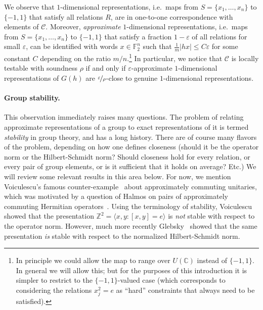 \documentclass[11pt]{article}
\theoremstyle{definition}
\newcommand{\code}{\mathscr{C}}
\newcommand{\C}{\ensuremath{\mathbb{C}}}
\newcommand{\F}{\ensuremath{\mathbb{F}}}
\newcommand{\Z}{\ensuremath{\mathbb{Z}}}
\newcommand{\eps}{\varepsilon}
\begin{document}
We observe that $1$-dimensional representations, i.e.\ maps from $S=\{x_1,\ldots,x_n\}$ to $\{-1,1\}$ that satisfy all relations $R$, are in one-to-one correspondence with elements of $\code$. Moreover, \emph{approximate} $1$-dimensional representations, i.e.\ maps from  $S=\{x_1,\ldots,x_n\}$ to $\{-1,1\}$ that satisfy a fraction $1-\eps$ of all relations for small $\eps$, can be identified with words $x\in\F_2^n$ such that $\frac{1}{m}|hx|\leq C\eps$ for some constant $C$ depending on the ratio $m/n$.\footnote{In principle we could allow the map to range over $U(\C)$ instead of $\{-1,1\}$. In general we will allow this; but for the purposes of this introduction it is simpler to restrict to the $\{-1,1\}$-valued case (which corresponds to considering the relations $x_j^2=e$ as ``hard'' constraints that always need to be satisfied).} In particular, we notice that $\code$ is locally testable with soundness $\rho$ if and only if $\eps$-approximate $1$-dimensional representations of $G(h)$ are $\nicefrac{\eps}{\rho}$-close to genuine $1$-dimensional representations. 

\paragraph{Group stability.}
This observation immediately raises many questions. The problem of relating approximate representations of a group to exact representations of it is termed \emph{stability} in group theory, and has a long history. There are of course many flavors of the problem, depending on how one defines closeness (should it be the operator norm or the Hilbert-Schmidt norm? Should closeness hold for every relation, or every pair of group elements, or is it sufficient that it holds on average? Etc.) We will review some relevant results in this area below. For now, we mention Voiculescu's famous counter-example~\cite{voiculescu1983asymptotically} about approximately commuting unitaries, which was motivated by a question of Halmos on pairs of approximately commuting Hermitian operators~\cite{halmos1976some}. Using the terminology of stability, Voiculescu showed that the presentation $\Z^2 = \langle x,y:[x,y]=e\rangle$ is \emph{not} stable with respect to the operator norm. However, much more recently Glebsky~\cite{glebsky2010almost} showed that the same presentation \emph{is} stable with respect to the normalized Hilbert-Schmidt norm. 
\end{document}
